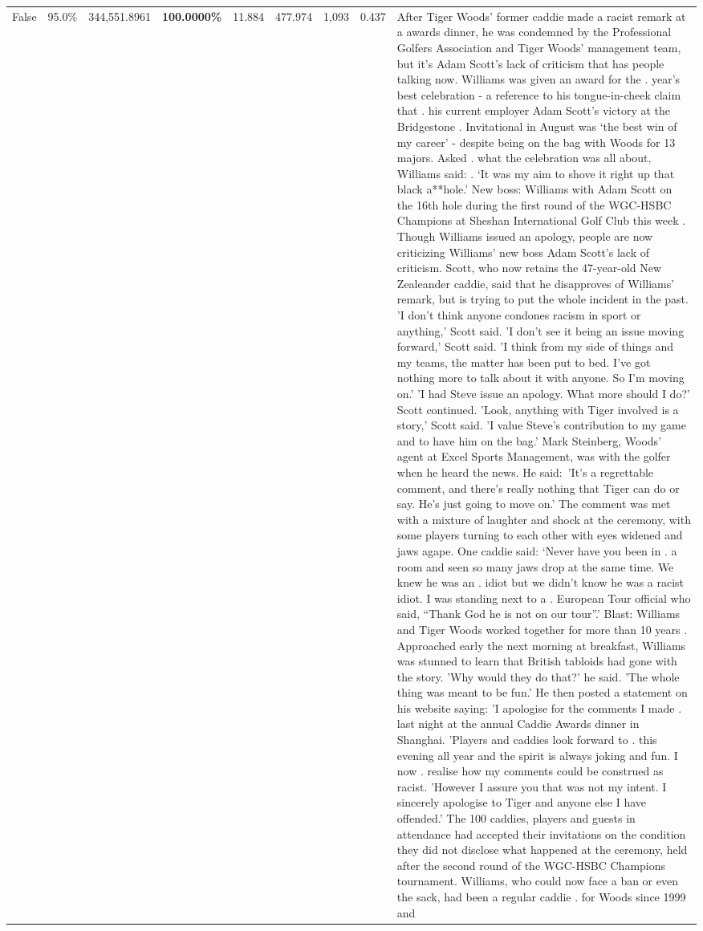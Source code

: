 \begin{table}[H]
\begin{tabular}{lllrlllll}
False & 95.0\% & 344,551.8961 & \bfseries \color{red} 100.0000\% & 11.884 & 477.974 & 1,093 & 0.437 & After Tiger Woods' former caddie made a racist remark at a awards dinner, he was condemned by the Professional Golfers Association and Tiger Woods' management team, but it's Adam Scott's lack of criticism that has people talking now. Williams was given an award for the . year’s best celebration - a reference to his tongue-in-cheek claim that . his current employer Adam Scott’s victory at the Bridgestone . Invitational in August was ‘the best win of my career’ - despite being on the bag with Woods for 13 majors. Asked . what the celebration was all about, Williams said: . ‘It was my aim to shove it right up that black a**hole.’ New boss: Williams with Adam Scott  on the 16th hole during the first round of the WGC-HSBC Champions at Sheshan International Golf Club this week . Though Williams issued an apology, people are now criticizing Williams' new boss Adam Scott's lack of criticism. Scott, who now retains the 47-year-old New Zealeander caddie, said that he disapproves of Williams' remark, but is trying to put the whole incident in the past. 'I don't think anyone condones racism in sport or anything,' Scott said. 'I don't see it being an issue moving forward,' Scott said. 'I think from my side of things and my teams, the matter has been put to bed. I've got nothing more to talk about it with anyone. So I'm moving on.' 'I had Steve issue an apology. What more should I do?' Scott continued. 'Look, anything with Tiger involved is a story,' Scott said. 'I value Steve's contribution to my game and to have him on the bag.' Mark Steinberg, Woods' agent at Excel Sports Management, was with the golfer when he heard the news. He said: 'It's a regrettable comment, and there's really nothing that Tiger can do or say. He's just going to move on.' The comment was met with a mixture of laughter and shock at the ceremony, with some players turning to each other with eyes widened and jaws agape. One caddie said: ‘Never have you been in . a room and seen so many jaws drop at the same time. We knew he was an . idiot but we didn’t know he was a racist idiot. I was standing next to a . European Tour official who said, “Thank God he is not on our tour”.’ Blast: Williams and Tiger Woods worked together for more than 10 years . Approached early the next morning at breakfast, Williams was stunned to learn that British tabloids had gone with the story. 'Why would they do that?' he said. 'The whole thing was meant to be fun.' He then posted a statement on his website saying: 'I apologise for the comments I made . last night at the annual Caddie Awards dinner in Shanghai. 'Players and caddies look forward to . this evening all year and the spirit is always joking and fun. I now . realise how my comments could be construed as racist. 'However I assure you that was not my intent. I sincerely apologise to Tiger and anyone else I have offended.' The 100 caddies, players and guests in attendance had accepted their invitations on the condition they did not disclose what happened at the ceremony, held after the second round of the WGC-HSBC Champions tournament. Williams, who could now face a ban or even the sack, had been a regular caddie . for Woods since 1999 and 
\end{tabular}
\end{table}
